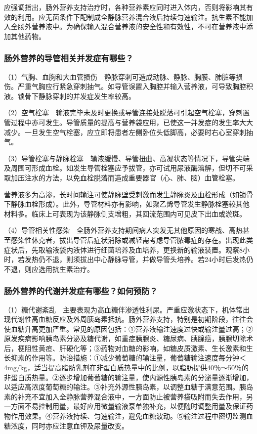 应强调指出，肠外营养支持治疗时，各种营养素应同时进入体内，否则将影响其有效的利用。应无菌条件下配制成全静脉营养混合液后持续匀速输注。抗生素不能加入全肠外营养液中。为确保输入混合营养液的安全性和有效性，不可在营养液中添加其他药物。

\subsubsection{肠外营养的导管相关并发症有哪些？}

（1）气胸、血胸和大血管损伤　静脉穿刺可造成动脉、静脉、胸膜、肺脏等损伤。严重气胸应行紧急穿刺抽气。如导管误置入胸腔并输入营养液，可导致胸腔积液。锁骨下静脉穿刺的并发症发生率较高。

（2）空气栓塞　输液完毕未及时更换或导管连接处脱落可引起空气栓塞，穿刺置管过程中亦可发生。导管质量的提高与营养袋应用，已使这一并发症的发生率大大减少。一旦发生空气栓塞，应立即将患者左侧卧位头低脚高，必要时右心室穿刺抽气。

（3）导管栓塞与静脉栓塞　输液缓慢、导管扭曲、高凝状态等情况下，导管尖端及周围可形成血栓。如发生导管栓塞应予拔管，亦可试用尿液酶溶解，但切不可采取加压注水的方法，以免血栓脱落而造成重要器官（心、肺、脑）血管栓塞。

营养液多为高渗，长时间输注可使静脉壁受刺激而发生静脉炎及血栓形成（如锁骨下静脉血栓形成）。此外，导管材料亦有影响，如聚乙烯导管发生静脉栓塞较其他材料多。临床上可表现为该静脉侧支增粗，其回流范围内可见皮下出血或淤斑。

（4）导管相关性感染　全肠外营养支持期间病人突发无其他原因的寒战、高热甚至感染性休克者，拔出导管后症状消除或减轻需考虑导管脓毒症的存在。出现此类症状后，先取输液袋内液体进行细菌培养及血培养，更换新的输液装置。观察8小时，若发热仍不退，则须拔出中心静脉导管，并做导管头培养。若24小时后发热仍不退，则应选用抗生素治疗。

\subsubsection{肠外营养的代谢并发症有哪些？如何预防？}

（1）糖代谢紊乱　主要表现为高血糖伴渗透性利尿。严重应激状态下，机体常出现代谢性高血糖反应及外周胰岛素抵抗。肠外营养支持，特别是初期阶段，往往会使血糖升高更加严重。常见的原因包括：①营养液输注速度过快或输注量过高；②原发疾病影响胰岛素分泌及糖代谢，如重症胰腺炎、糖尿病、胰腺癌，胰腺切除术后，梗阻性黄疸、肝硬化等；③药物对血糖的影响，如糖皮质激素、生长激素和生长抑素的作用等。防治措施：①减少葡萄糖的输注量，葡萄糖输注速度每分钟＜4mg/kg，适当提高脂肪乳剂在非蛋白质热量中的比例，以脂肪提供40％～50％的非蛋白质热量。②逐步增加葡萄糖的输注量，使内源性胰岛素的分泌量逐渐增加，以适应高浓度葡萄糖的输注。③补充外源性胰岛素，以调整血糖于满意范围。胰岛素的补充不宜加入全静脉营养混合液中，一方面防止被营养袋吸附而失去作用，另一方面不易控制用量，最好应用微量输液泵单独补充，以便随时调整用量及保证药物作用效果。④营养液持续、匀速输注，避免血糖波动。⑤输注过程中密切监测血糖浓度，同时亦应注意血钾及尿量改变。

